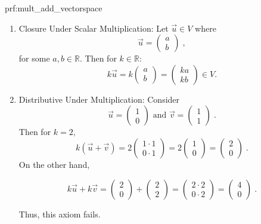 \begin{prf}{prf:mult_add_vectorspace}
\begin{enumerate}
\item Closure Under Scalar Multiplication: Let $\vec{u} \in V$ where $$ \vec{u} = \begin{pmatrix}
a \\
b
\end{pmatrix}\;,$$
for some $a,b \in \mathbb{R}.$ Then for $k \in \mathbb{R}:$
$$k\vec{u} = k \begin{pmatrix}
a \\
b
\end{pmatrix} = \begin{pmatrix}
ka \\
kb
\end{pmatrix} \in V.$$

\item Distributive Under Multiplication: Consider
$$\vec{u} = \begin{pmatrix}
1 \\
0
\end{pmatrix} \text{ and } \vec{v} = \begin{pmatrix}
1 \\
1
\end{pmatrix}\;.$$
Then for $k =2,$
$$k(\vec{u}+\vec{v}) = 2 \begin{pmatrix}
1 \cdot 1 \\
0 \cdot 1
\end{pmatrix} = 2 \begin{pmatrix}
1 \\
0
\end{pmatrix} = \begin{pmatrix}
2 \\
0
\end{pmatrix}\;. $$
On the other hand,

$$k\vec{u}+ k\vec{v} = \begin{pmatrix}
2 \\
0
\end{pmatrix} + \begin{pmatrix}
2 \\
2
\end{pmatrix} = \begin{pmatrix}
2\cdot 2 \\
0 \cdot 2
\end{pmatrix} = \begin{pmatrix}
4 \\
0
\end{pmatrix}\;. $$

Thus, this axiom fails.


\end{enumerate}
\end{prf}
